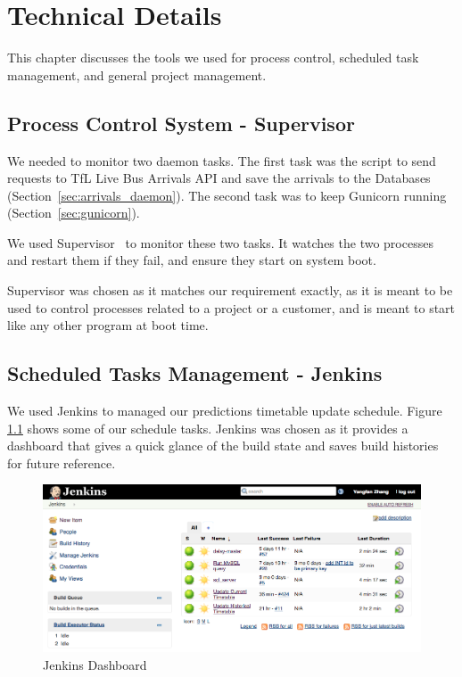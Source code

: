 \chapter{Technical Details}
\par This chapter discusses the tools we used for process control, scheduled task management, and general project management.

\section{Process Control System - Supervisor}
\par We needed to monitor two daemon tasks. The first task was the script to send requests to TfL Live Bus Arrivals API and save the arrivals to the Databases (Section~\ref{sec:arrivals_daemon}). The second task was to keep Gunicorn running (Section~\ref{sec:gunicorn}).

\par We used Supervisor~\cite{supervisor} to monitor these two tasks. It watches the two processes and restart them if they fail, and ensure they start on system boot.

\par Supervisor was chosen as it matches our requirement exactly, as it is meant to be used to control processes related to a project or a customer, and is meant to start like any other program at boot time.

\section{Scheduled Tasks Management - Jenkins}
\par We used Jenkins \cite{jenkins} to managed our predictions timetable update schedule. Figure \ref{fig:jenkins} shows some of our schedule tasks. Jenkins was chosen as it provides a dashboard that gives a quick glance of the build state and saves build histories for future reference.

\begin{figure}
\centering
\includegraphics[width=\textwidth]{figures/jenkins.png}
\caption{\label{fig:jenkins} Jenkins Dashboard}
\end{figure}

